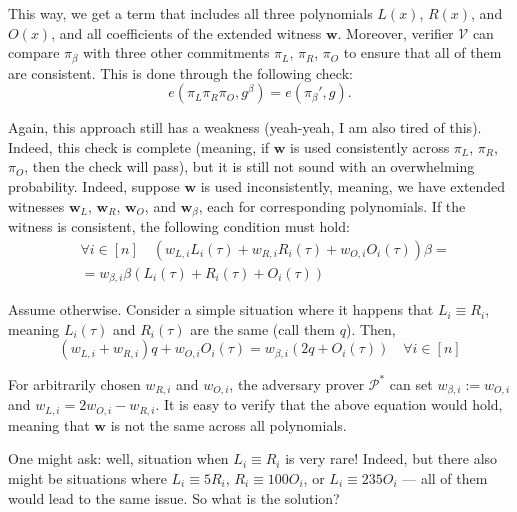 \documentclass[../lecture-notes.tex]{subfiles}
\begin{document}
This way, we get a term that includes all three polynomials $L(x)$, $R(x)$, and $O(x)$, and all coefficients of the extended witness $\mathbf{w}$. Moreover, verifier $\mathcal{V}$ can compare $\pi_{\beta}$ with three other commitments $\pi_L$, $\pi_R$, $\pi_O$ to ensure that all of them are consistent. This is done through the following check:
\begin{equation*}
    e(\pi_L\pi_R\pi_O, g^{\beta}) = e(\pi_{\beta}', g).
\end{equation*}

Again, this approach still has a weakness (yeah-yeah, I am also tired of this). Indeed, this check is complete (meaning, if $\mathbf{w}$ is used consistently across $\pi_L$, $\pi_R$, $\pi_O$, then the check will pass), but it is still not sound with an overwhelming probability. Indeed, suppose $\mathbf{w}$ is used inconsistently, meaning, we have extended witnesses $\mathbf{w}_L$, $\mathbf{w}_R$, $\mathbf{w}_O$, and $\mathbf{w}_{\beta}$, each for corresponding polynomials. If the witness is consistent, the following condition must hold:
\begin{equation*}
    \begin{aligned}
        &\forall i \in [n] \quad (w_{L,i}L_i(\tau) + w_{R,i}R_i(\tau) + w_{O,i}O_i(\tau))\beta = \\ &= w_{\beta,i}\beta(L_i(\tau) + R_i(\tau) + O_i(\tau))       
    \end{aligned}
\end{equation*}

Assume otherwise. Consider a simple situation where it happens that $L_i \equiv R_i$, meaning $L_i(\tau)$ and $R_i(\tau)$ are the same (call them $q$). Then,
\begin{equation*}
    (w_{L,i} + w_{R,i})q + w_{O,i}O_i(\tau)= w_{\beta,i}(2q + O_i(\tau)) \quad \forall i \in [n]
\end{equation*}

For arbitrarily chosen $w_{R,i}$ and $w_{O,i}$, the adversary prover $\mathcal{P}^*$ can set $w_{\beta,i} := w_{O,i}$ and $w_{L,i}=2w_{O,i} - w_{R,i}$. It is easy to verify that the above equation would hold, meaning that $\mathbf{w}$ is not the same across all polynomials. 

One might ask: well, situation when $L_i \equiv R_i$ is very rare! Indeed, but there also might be situations where $L_i \equiv 5R_i$, $R_i \equiv 100O_i$, or $L_i \equiv 235O_i$ --- all of them would lead to the same issue. So what is the solution? 
\end{document}
